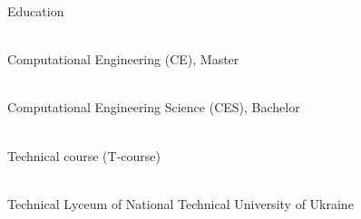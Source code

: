 \documentclass[12pt]{article} %
\begin{document}
\begin{ItemizeSection}{Education}
    \item {} \\
    Computational Engineering (CE), Master

    \item {} \\
    Computational Engineering Science (CES), Bachelor

    \item {} \\
    Technical course (T-course)

    \item {} \\
    Technical Lyceum of National Technical University of Ukraine 
\end{ItemizeSection}
\end{document}
